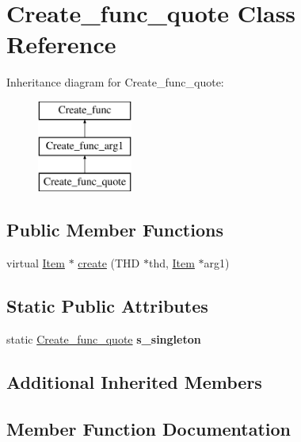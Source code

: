 \hypertarget{classCreate__func__quote}{}\section{Create\+\_\+func\+\_\+quote Class Reference}
\label{classCreate__func__quote}
Inheritance diagram for Create\+\_\+func\+\_\+quote\+:\begin{figure}[H]
\begin{center}
\leavevmode
\includegraphics[height=3.000000cm]{classCreate__func__quote}
\end{center}
\end{figure}
\subsection*{Public Member Functions}
\begin{DoxyCompactItemize}
\item 
virtual \mbox{\hyperlink{classItem}{Item}} $\ast$ \mbox{\hyperlink{classCreate__func__quote_a396aacc9e189e33e7fbbe06261543785}{create}} (T\+HD $\ast$thd, \mbox{\hyperlink{classItem}{Item}} $\ast$arg1)
\end{DoxyCompactItemize}
\subsection*{Static Public Attributes}
\begin{DoxyCompactItemize}
\item 
\mbox{\label{classCreate__func__quote_abe4494b6ffd8ec4f3b481cf218bbe6ad}} 
static \mbox{\hyperlink{classCreate__func__quote}{Create\+\_\+func\+\_\+quote}} {\bfseries s\+\_\+singleton}
\end{DoxyCompactItemize}
\subsection*{Additional Inherited Members}


\subsection{Member Function Documentation}
\mbox{\label{classCreate__func__quote_a396aacc9e189e33e7fbbe06261543785}} 
